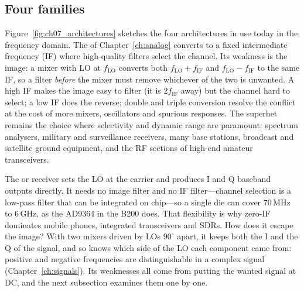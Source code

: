 
\subsection{Four families}

Figure~\ref{fig:ch07_architectures} sketches the four architectures in use today in the frequency
domain. The  of Chapter~\ref{ch:analog} converts to a fixed intermediate frequency
(IF) where high-quality filters select the channel. Its weakness is the image: a mixer with LO
at $f_{\text{LO}}$ converts both $f_{\text{LO}}+f_{\text{IF}}$ and $f_{\text{LO}}-f_{\text{IF}}$ to the
same IF, so a filter \emph{before} the mixer must remove whichever of the two is unwanted. A high IF
makes the image easy to filter (it is $2f_{\text{IF}}$ away) but the channel hard to select; a low IF
does the reverse; double and triple conversion resolve the conflict at the cost of more mixers,
oscillators and spurious responses. The superhet remains the choice where selectivity and dynamic range
are paramount: spectrum analysers, military and surveillance receivers, many base stations, broadcast
and satellite ground equipment, and the RF sections of high-end amateur transceivers.

The  or  receiver sets the LO at the carrier and produces I and
Q baseband outputs directly. It needs no image filter and no IF filter---channel selection is a
low-pass filter that can be integrated on chip---so a single die can cover 70\,MHz to 6\,GHz, as the
AD9364 in the B200 does. That flexibility is why zero-IF dominates mobile phones, integrated
transceivers and SDRs. How does it escape the image? With two mixers driven by LOs $90^\circ$ apart,
it keeps both the I and the Q of the signal, and so knows which side of the LO each component came
from: positive and negative frequencies are distinguishable in a complex signal
(Chapter~\ref{ch:signals}). Its weaknesses all come from putting the wanted signal at DC, and the next
subsection examines them one by one.


